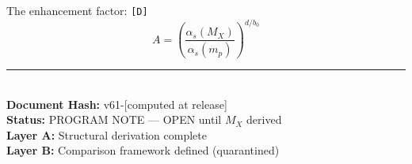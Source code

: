 \documentclass[11pt,a4paper]{article}
\newcommand{\tagD}{\textcolor{green!50!black}{\texttt{[D]}}}
\theoremstyle{definition}
\begin{document}
The enhancement factor: \tagD{}
\begin{equation}
\label{eq:enhancement}
A = \left( \frac{\alpha_s(M_X)}{\alpha_s(m_p)} \right)^{d/b_0}
\end{equation}


\vfill
\begin{center}
\rule{0.5\textwidth}{0.4pt}\\[0.5em]
\textbf{Document Hash:} v61-[computed at release]\\
\textbf{Status:} PROGRAM NOTE --- OPEN until $M_X$ derived\\
\textbf{Layer A:} Structural derivation complete\\
\textbf{Layer B:} Comparison framework defined (quarantined)
\end{center}
\end{document}
